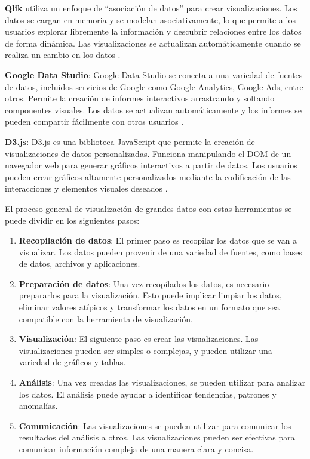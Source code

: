 \documentclass[
  11pt,
  bookmarksnumbered]{article}
\begin{document}
\textbf{Qlik} utiliza un enfoque de ``asociación de datos'' para crear visualizaciones.
Los datos se cargan en memoria y se modelan asociativamente, lo que permite a los usuarios explorar libremente la información y descubrir relaciones entre los datos de forma dinámica.
Las visualizaciones se actualizan automáticamente cuando se realiza un cambio en los datos \textcite{qlik2023difference}.

\textbf{Google Data Studio}: Google Data Studio se conecta a una variedad de fuentes de datos, incluidos servicios de Google como Google Analytics, Google Ads, entre otros.
Permite la creación de informes interactivos arrastrando y soltando componentes visuales.
Los datos se actualizan automáticamente y los informes se pueden compartir fácilmente con otros usuarios \textcite{looker2023support}.

\textbf{D3.js}: D3.js es una biblioteca JavaScript que permite la creación de visualizaciones de datos personalizadas.
Funciona manipulando el DOM de un navegador web para generar gráficos interactivos a partir de datos.
Los usuarios pueden crear gráficos altamente personalizados mediante la codificación de las interacciones y elementos visuales deseados \textcite{d3js2023d3}.

El proceso general de visualización de grandes datos con estas herramientas se puede dividir en los siguientes pasos:

\begin{enumerate}
\def\labelenumi{\arabic{enumi}.}
\item
  \textbf{Recopilación de datos}: El primer paso es recopilar los datos que se van a visualizar.
  Los datos pueden provenir de una variedad de fuentes, como bases de datos, archivos y aplicaciones.
\item
  \textbf{Preparación de datos}: Una vez recopilados los datos, es necesario prepararlos para la visualización.
  Esto puede implicar limpiar los datos, eliminar valores atípicos y transformar los datos en un formato que sea compatible con la herramienta de visualización.
\item
  \textbf{Visualización}: El siguiente paso es crear las visualizaciones.
  Las visualizaciones pueden ser simples o complejas, y pueden utilizar una variedad de gráficos y tablas.
\item
  \textbf{Análisis}: Una vez creadas las visualizaciones, se pueden utilizar para analizar los datos.
  El análisis puede ayudar a identificar tendencias, patrones y anomalías.
\item
  \textbf{Comunicación}: Las visualizaciones se pueden utilizar para comunicar los resultados del análisis a otros.
  Las visualizaciones pueden ser efectivas para comunicar información compleja de una manera clara y concisa.
\end{enumerate}
\end{document}
